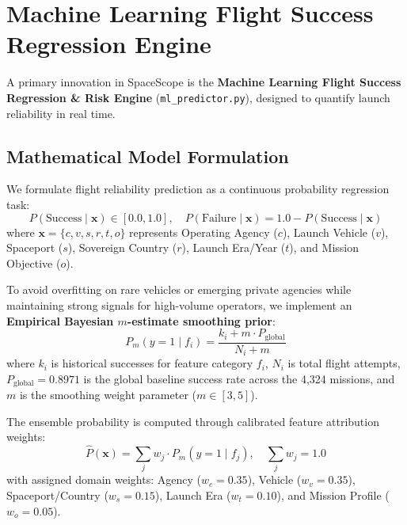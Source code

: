 \documentclass[10pt]{article}
\begin{document}
\section{Machine Learning Flight Success Regression Engine}

A primary innovation in SpaceScope is the \textbf{Machine Learning Flight Success Regression \& Risk Engine} (\texttt{ml\_predictor.py}), designed to quantify launch reliability in real time.

\subsection{Mathematical Model Formulation}
We formulate flight reliability prediction as a continuous probability regression task:
\begin{equation}
    P(\text{Success} \mid \mathbf{x}) \in [0.0, 1.0], \quad P(\text{Failure} \mid \mathbf{x}) = 1.0 - P(\text{Success} \mid \mathbf{x})
\end{equation}
where $\mathbf{x} = \{c, v, s, r, t, o\}$ represents Operating Agency ($c$), Launch Vehicle ($v$), Spaceport ($s$), Sovereign Country ($r$), Launch Era/Year ($t$), and Mission Objective ($o$).

To avoid overfitting on rare vehicles or emerging private agencies while maintaining strong signals for high-volume operators, we implement an \textbf{Empirical Bayesian $m$-estimate smoothing prior}:
\begin{equation}
    P_m(y=1 \mid f_i) = \frac{k_i + m \cdot P_{\text{global}}}{N_i + m}
\end{equation}
where $k_i$ is historical successes for feature category $f_i$, $N_i$ is total flight attempts, $P_{\text{global}} = 0.8971$ is the global baseline success rate across the 4,324 missions, and $m$ is the smoothing weight parameter ($m \in [3, 5]$).

The ensemble probability is computed through calibrated feature attribution weights:
\begin{equation}
    \hat{P}(\mathbf{x}) = \sum_{j} w_j \cdot P_m(y=1 \mid f_j), \quad \sum_j w_j = 1.0
\end{equation}
with assigned domain weights: Agency ($w_c = 0.35$), Vehicle ($w_v = 0.35$), Spaceport/Country ($w_s = 0.15$), Launch Era ($w_t = 0.10$), and Mission Profile ($w_o = 0.05$).
\end{document}
